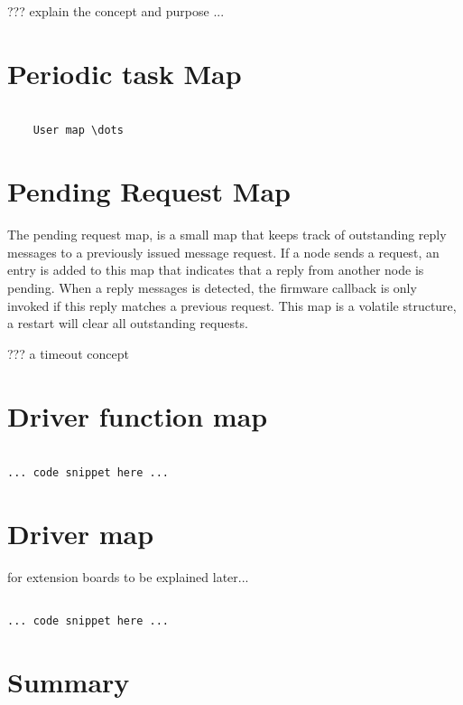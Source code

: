  ??? explain the concept and purpose ...

 \section{Periodic task Map}

\lstset{language=c++, style=codesnippetstyle}
\begin{lstlisting}

    User map \dots

\end{lstlisting}

 \section{Pending Request Map}

The pending request map, is a small map that keeps track of outstanding reply messages to a previously issued message request. If a node sends a request, an entry is added to this map that indicates that a reply from another node is pending. When a reply messages is detected, the firmware callback is only invoked if this reply matches a previous request. This map is a volatile structure, a restart will clear all outstanding requests.

??? a timeout concept

\section{Driver function map}

\lstset{language=c++, style=codesnippetstyle}
\begin{lstlisting}

... code snippet here ...

\end{lstlisting}

\section{Driver map}

for extension boards to be explained later...

\lstset{language=c++, style=codesnippetstyle}
\begin{lstlisting}

... code snippet here ...

\end{lstlisting}

\section{Summary}

